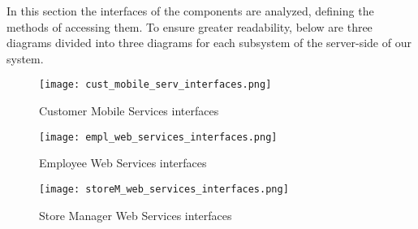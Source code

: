 In this section the interfaces of the components are analyzed, defining the methods of accessing them. To ensure greater readability, below are three diagrams divided into three diagrams for each subsystem of the server-side of our system.

\begin{figure}[H]
    \centering
    \texttt{[image: cust\_mobile\_serv\_interfaces.png]}
    \caption{Customer Mobile Services interfaces}
\end{figure}

\begin{figure}[H]
    \centering
    \texttt{[image: empl\_web\_services\_interfaces.png]}
    \caption{Employee Web Services interfaces}
\end{figure}

\begin{figure}[H]
    \centering
    \texttt{[image: storeM\_web\_services\_interfaces.png]}
    \caption{Store Manager Web Services interfaces}
\end{figure}